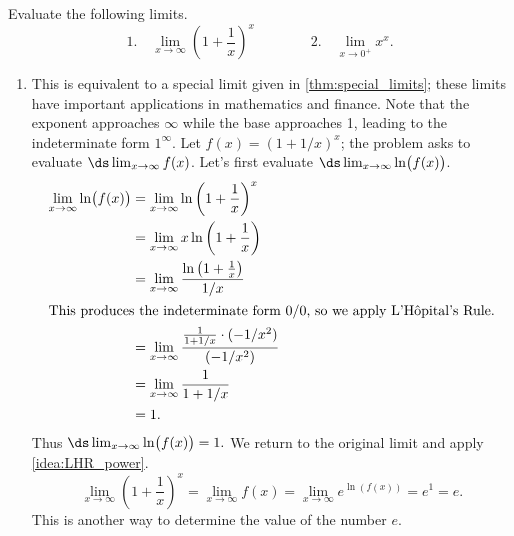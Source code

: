 \begin{example}\label{ex_LHR4}
Evaluate the following limits.
\[
 \text{1.}\quad\lim_{x\to\infty} \left(1+\frac1x\right)^x \qquad\qquad
 \text{2.}\quad\lim_{x\to0^+} x^x.
\]
\solution
\begin{enumerate}
\item		This is equivalent to a special limit given in \autoref{thm:special_limits}; these limits have important applications in mathematics and finance. Note that the exponent approaches $\infty$ while the base approaches 1, leading to the indeterminate form $1^\infty$. Let $f(x) = (1+1/x)^x$; the problem asks to evaluate $\ds\lim_{x\to\infty}f(x)$. Let's first evaluate $\ds \lim_{x\to\infty}\ln\bigl(f(x)\bigr)$.
\begin{align*}
\lim_{x\to\infty}\ln\bigl(f(x)\bigr)
			&= \lim_{x\to\infty} \ln \left(1+\frac1x\right)^x \\
			&= \lim_{x\to\infty} x\ln\left(1+\frac1x\right)\\
			&= \lim_{x\to\infty} \frac{\ln\left(1+\frac1x\right)}{1/x}\\
			\intertext{This produces the indeterminate form 0/0, so we apply L'Hôpital's Rule.}
			&=	\lim_{x\to\infty} \frac{\frac{1}{1+1/x}\cdot(-1/x^2)}{(-1/x^2)} \\
			&= \lim_{x\to\infty}\frac{1}{1+1/x}\\
			&= 1.
\end{align*}
Thus $\ds\lim_{x\to\infty} \ln \bigl(f(x)\bigr) = 1.$ We return to the original limit and apply \autoref{idea:LHR_power}.
\[\lim_{x\to\infty}\left(1+\frac1x\right)^x = \lim_{x\to\infty} f(x) =  \lim_{x\to\infty}e^{\ln (f(x))} = e^1 = e.\]
This is another way to determine the value of the number $e$.


\end{enumerate}
\end{example}
